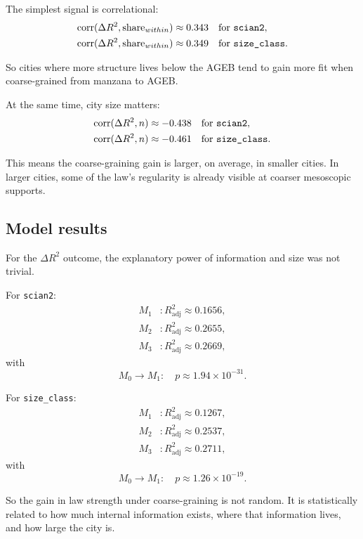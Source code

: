 \documentclass[11pt]{article}
\newcommand{\adjR}{R^2_{\mathrm{adj}}}
\begin{document}
The simplest signal is correlational:
\begin{align}
\mathrm{corr}(\Delta R^2,\text{share}_{within})
&\approx 0.343
\quad \text{for \texttt{scian2}},\\
\mathrm{corr}(\Delta R^2,\text{share}_{within})
&\approx 0.349
\quad \text{for \texttt{size\_class}}.
\end{align}

So cities where more structure lives below the AGEB tend to gain more fit when coarse-grained from manzana to AGEB.

At the same time, city size matters:
\begin{align}
\mathrm{corr}(\Delta R^2,n)
&\approx -0.438
\quad \text{for \texttt{scian2}},\\
\mathrm{corr}(\Delta R^2,n)
&\approx -0.461
\quad \text{for \texttt{size\_class}}.
\end{align}

This means the coarse-graining gain is larger, on average, in smaller cities. In larger cities, some of the law's regularity is already visible at coarser mesoscopic supports.

\subsection{Model results}

For the \(\Delta R^2\) outcome, the explanatory power of information and size was not trivial.

For \texttt{scian2}:
\begin{align}
M_1 &: \adjR \approx 0.1656,\\
M_2 &: \adjR \approx 0.2655,\\
M_3 &: \adjR \approx 0.2669,
\end{align}
with
\begin{equation}
M_0\rightarrow M_1:
\quad
p \approx 1.94\times 10^{-31}.
\end{equation}

For \texttt{size\_class}:
\begin{align}
M_1 &: \adjR \approx 0.1267,\\
M_2 &: \adjR \approx 0.2537,\\
M_3 &: \adjR \approx 0.2711,
\end{align}
with
\begin{equation}
M_0\rightarrow M_1:
\quad
p \approx 1.26\times 10^{-19}.
\end{equation}

So the gain in law strength under coarse-graining is not random. It is statistically related to how much internal information exists, where that information lives, and how large the city is.
\end{document}
